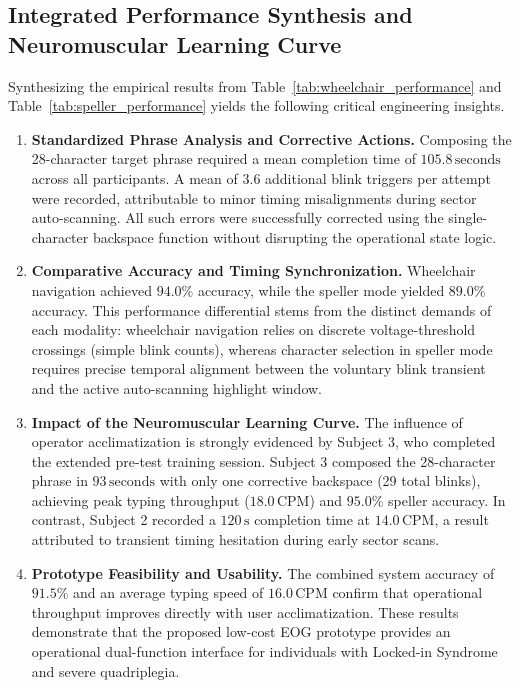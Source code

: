 \FloatBarrier
\subsection{Integrated Performance Synthesis and Neuromuscular Learning Curve}
\label{subsec:integrated_synthesis}

Synthesizing the empirical results from Table~\ref{tab:wheelchair_performance} and
Table~\ref{tab:speller_performance} yields the following critical engineering insights.

\begin{enumerate}

  \item \textbf{Standardized Phrase Analysis and Corrective Actions.}
  Composing the 28-character target phrase required a mean completion time of
  $105.8\,\text{seconds}$ across all participants. A mean of $3.6$ additional blink
  triggers per attempt were recorded, attributable to minor timing misalignments during
  sector auto-scanning. All such errors were successfully corrected using the
  single-character backspace function without disrupting the operational state logic.

  \item \textbf{Comparative Accuracy and Timing Synchronization.}
  Wheelchair navigation achieved $94.0\%$ accuracy, while the speller mode yielded
  $89.0\%$ accuracy. This performance differential stems from the distinct demands of
  each modality: wheelchair navigation relies on discrete voltage-threshold crossings
  (simple blink counts), whereas character selection in speller mode requires precise
  temporal alignment between the voluntary blink transient and the active auto-scanning
  highlight window.

  \item \textbf{Impact of the Neuromuscular Learning Curve.}
  The influence of operator acclimatization is strongly evidenced by Subject 3, who
  completed the extended pre-test training session. Subject 3 composed the
  28-character phrase in $93\,\text{seconds}$ with only one corrective backspace
  (29 total blinks), achieving peak typing throughput ($18.0\,\text{CPM}$) and
  $95.0\%$ speller accuracy. In contrast, Subject 2 recorded a $120\,\text{s}$
  completion time at $14.0\,\text{CPM}$, a result attributed to transient timing
  hesitation during early sector scans.

  \item \textbf{Prototype Feasibility and Usability.}
  The combined system accuracy of $91.5\%$ and an average typing speed of
  $16.0\,\text{CPM}$ confirm that operational throughput improves directly with
  user acclimatization. These results demonstrate that the proposed low-cost EOG
  prototype provides an operational dual-function interface for individuals with
  Locked-in Syndrome and severe quadriplegia.

\end{enumerate}

